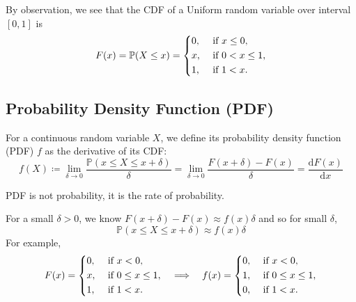 By observation, we see that the CDF of a Uniform random variable over interval \([0, 1]\) is 
\[
    F(x) = \mathbb{P}(X \leq x) = \begin{dcases}
        0, &\text{ if } x \leq 0 ,\\
        x, &\text{ if } 0 < x \leq 1 ,\\
        1, &\text{ if } 1 < x.
    \end{dcases}
\]

\subsection{Probability Density Function (PDF)}
\begin{definition}
    For a continuous random variable \(X\), we define its probability density function (PDF) \(f\) as the derivative of its CDF:
    \[
        f(X) \coloneqq \lim_{\delta \to 0} \dfrac{\mathbb{P}(x \leq X \leq x + \delta)}{\delta}= \lim_{\delta \to 0} \dfrac{F(x + \delta) - F(x)}{\delta} = \frac{\mathrm{d}F(x)}{\mathrm{d}x}  
    \]

    \begin{remark}
        PDF is not probability, it is the rate of probability. 
    \end{remark}
\end{definition}

For a small \(\delta > 0\), we know \(F(x + \delta) - F(x) \approx f(x)\delta\) and so for small \(\delta \), 
\[
    \mathbb{P}(x \leq X \leq x + \delta) \approx f(x)\delta
\]
For example, 
\[
    F(x) = \begin{dcases}
        0, &\text{ if } x < 0 ,\\
        x, &\text{ if } 0 \leq  x \leq 1 ,\\
        1, &\text{ if } 1 < x.
    \end{dcases}
    \quad\Longrightarrow\quad 
    f(x) = \begin{dcases}
        0, &\text{ if } x < 0 ,\\
        1, &\text{ if } 0 \leq x \leq 1 ,\\
        0, &\text{ if } 1 < x.
    \end{dcases}
\]

